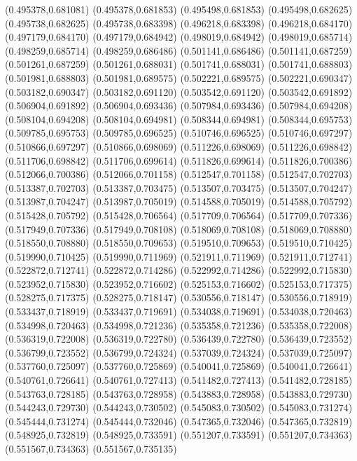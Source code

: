 (0.495378,0.681081)
(0.495378,0.681853)
(0.495498,0.681853)
(0.495498,0.682625)
(0.495738,0.682625)
(0.495738,0.683398)
(0.496218,0.683398)
(0.496218,0.684170)
(0.497179,0.684170)
(0.497179,0.684942)
(0.498019,0.684942)
(0.498019,0.685714)
(0.498259,0.685714)
(0.498259,0.686486)
(0.501141,0.686486)
(0.501141,0.687259)
(0.501261,0.687259)
(0.501261,0.688031)
(0.501741,0.688031)
(0.501741,0.688803)
(0.501981,0.688803)
(0.501981,0.689575)
(0.502221,0.689575)
(0.502221,0.690347)
(0.503182,0.690347)
(0.503182,0.691120)
(0.503542,0.691120)
(0.503542,0.691892)
(0.506904,0.691892)
(0.506904,0.693436)
(0.507984,0.693436)
(0.507984,0.694208)
(0.508104,0.694208)
(0.508104,0.694981)
(0.508344,0.694981)
(0.508344,0.695753)
(0.509785,0.695753)
(0.509785,0.696525)
(0.510746,0.696525)
(0.510746,0.697297)
(0.510866,0.697297)
(0.510866,0.698069)
(0.511226,0.698069)
(0.511226,0.698842)
(0.511706,0.698842)
(0.511706,0.699614)
(0.511826,0.699614)
(0.511826,0.700386)
(0.512066,0.700386)
(0.512066,0.701158)
(0.512547,0.701158)
(0.512547,0.702703)
(0.513387,0.702703)
(0.513387,0.703475)
(0.513507,0.703475)
(0.513507,0.704247)
(0.513987,0.704247)
(0.513987,0.705019)
(0.514588,0.705019)
(0.514588,0.705792)
(0.515428,0.705792)
(0.515428,0.706564)
(0.517709,0.706564)
(0.517709,0.707336)
(0.517949,0.707336)
(0.517949,0.708108)
(0.518069,0.708108)
(0.518069,0.708880)
(0.518550,0.708880)
(0.518550,0.709653)
(0.519510,0.709653)
(0.519510,0.710425)
(0.519990,0.710425)
(0.519990,0.711969)
(0.521911,0.711969)
(0.521911,0.712741)
(0.522872,0.712741)
(0.522872,0.714286)
(0.522992,0.714286)
(0.522992,0.715830)
(0.523952,0.715830)
(0.523952,0.716602)
(0.525153,0.716602)
(0.525153,0.717375)
(0.528275,0.717375)
(0.528275,0.718147)
(0.530556,0.718147)
(0.530556,0.718919)
(0.533437,0.718919)
(0.533437,0.719691)
(0.534038,0.719691)
(0.534038,0.720463)
(0.534998,0.720463)
(0.534998,0.721236)
(0.535358,0.721236)
(0.535358,0.722008)
(0.536319,0.722008)
(0.536319,0.722780)
(0.536439,0.722780)
(0.536439,0.723552)
(0.536799,0.723552)
(0.536799,0.724324)
(0.537039,0.724324)
(0.537039,0.725097)
(0.537760,0.725097)
(0.537760,0.725869)
(0.540041,0.725869)
(0.540041,0.726641)
(0.540761,0.726641)
(0.540761,0.727413)
(0.541482,0.727413)
(0.541482,0.728185)
(0.543763,0.728185)
(0.543763,0.728958)
(0.543883,0.728958)
(0.543883,0.729730)
(0.544243,0.729730)
(0.544243,0.730502)
(0.545083,0.730502)
(0.545083,0.731274)
(0.545444,0.731274)
(0.545444,0.732046)
(0.547365,0.732046)
(0.547365,0.732819)
(0.548925,0.732819)
(0.548925,0.733591)
(0.551207,0.733591)
(0.551207,0.734363)
(0.551567,0.734363)
(0.551567,0.735135)
